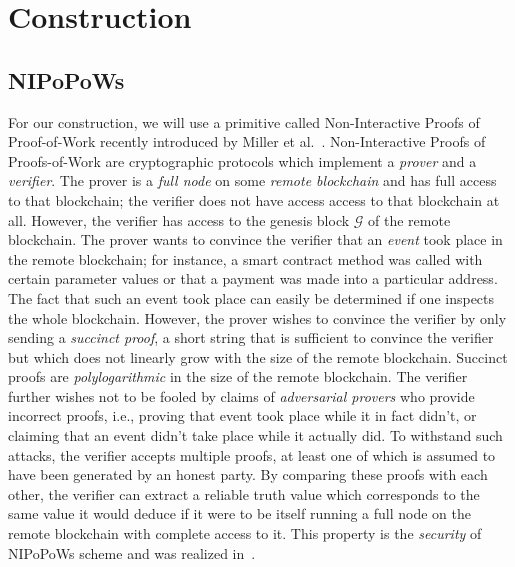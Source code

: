\section{Construction}
\subsection*{NIPoPoWs}
For our construction, we will use a primitive called Non-Interactive Proofs of
Proof-of-Work recently introduced by Miller et al.~\cite{nipopows}.
Non-Interactive Proofs of Proofs-of-Work are cryptographic protocols which
implement a \emph{prover} and a \emph{verifier}. The prover is a \emph{full
node} on some \emph{remote blockchain} and has full access to that blockchain;
the verifier does not have access access to that blockchain at all. However, the
verifier has access to the genesis block $\mathcal{G}$ of the remote blockchain.
The prover wants to convince the verifier that an \emph{event} took place in the
remote blockchain; for instance, a smart contract method was called with certain
parameter values or that a payment was made into a particular address. The fact
that such an event took place can easily be determined if one inspects the whole
blockchain. However, the prover wishes to convince the verifier by only sending
a \emph{succinct proof}, a short string that is sufficient to convince the
verifier but which does not linearly grow with the size of the remote
blockchain. Succinct proofs are \emph{polylogarithmic} in the size of the remote
blockchain. The verifier further wishes not to be fooled by claims of
\emph{adversarial provers} who provide incorrect proofs, i.e., proving that
event took place while it in fact didn't, or claiming that an event didn't take
place while it actually did. To withstand such attacks, the verifier accepts
multiple proofs, at least one of which is assumed to have been generated by an
honest party. By comparing these proofs with each other, the verifier can
extract a reliable truth value which corresponds to the same value it would
deduce if it were to be itself running a full node on the remote blockchain with
complete access to it. This property is the \emph{security} of NIPoPoWs scheme
and was realized in~\cite{nipopows}.

